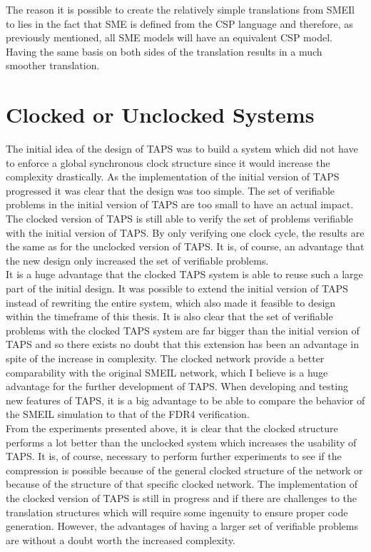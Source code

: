 The reason it is possible to create the relatively simple translations from SMEIl to \cspm{} lies in the fact that SME is defined from the CSP language and therefore, as previously mentioned, all SME models will have an equivalent CSP model. Having the same basis on both sides of the translation results in a much smoother translation.

\section{Clocked or Unclocked \cspm{} Systems}
The initial idea of the design of TAPS was to build a system which did not have to enforce a global synchronous clock structure since it would increase the complexity drastically. As the implementation of the initial version of TAPS progressed it was clear that the design was too simple. The set of verifiable problems in the initial version of TAPS are too small to have an actual impact.
The clocked version of TAPS is still able to verify the set of problems verifiable with the initial version of TAPS. By only verifying one clock cycle, the results are the same as for the unclocked version of TAPS. It is, of course, an advantage that the new design only increased the set of verifiable problems. \\

It is a huge advantage that the clocked TAPS system is able to reuse such a large part of the initial design. It was possible to extend the initial version of TAPS instead of rewriting the entire system, which also made it feasible to design within the timeframe of this thesis.
It is also clear that the set of verifiable problems with the clocked TAPS system are far bigger than the initial version of TAPS and so there exists no doubt that this extension has been an advantage in spite of the increase in complexity.
The clocked \cspm{} network provide a better comparability with the original SMEIL network, which I believe is a huge advantage for the further development of TAPS. When developing and testing new features of TAPS, it is a big advantage to be able to compare the behavior of the SMEIL simulation to that of the FDR4 verification. \\

From the experiments presented above, it is clear that the clocked structure performs a lot better than the unclocked system which increases the usability of TAPS. It is, of course, necessary to perform further experiments to see if the compression is possible because of the general clocked structure of the network or because of the structure of that specific clocked network.
The implementation of the clocked version of TAPS is still in progress and if there are challenges to the translation structures which will require some ingenuity to ensure proper code generation. However, the advantages of having a larger set of verifiable problems are without a doubt worth the increased complexity.
